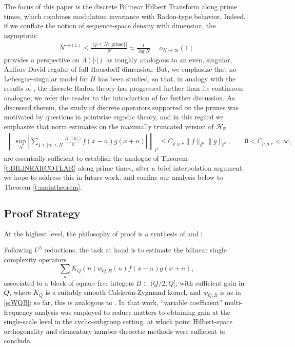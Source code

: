 \documentclass[12pt,leqno]{amsart}
\numberwithin{equation}{section}
\theoremstyle{definition}
\theoremstyle{plain}
\begin{document}
	The focus of this paper is the discrete Bilinear Hilbert Transform along prime times, which combines modulation invariance with Radon-type behavior. Indeed, if we conflate the notion of sequence-space density with dimension, the asymptotic
	\begin{align}
		N^{-o(1)} \leq \frac{|\{p \leq N: \text{ prime}\}|}{N} \approx \frac{1}{\log N} = o_{N\to \infty}(1)
	\end{align}
	provides a perspective on $\Lambda(|\cdot|)$ as roughly analogous to an even, singular, Ahlfors-David regular of full Hausdorff dimension. But, we emphasize that no Lebesgue-singular model for $H$ has been studied, so that, in analogy with the results of \cite{FKMS26}, the discrete Radon theory has progressed further than its continuous analogue; we refer the reader to the introduction of \cite{FKMS26} for further discussion. As discussed therein, the study of discrete operators supported on the primes was motivated by questions in pointwise ergodic theory, and in this regard we emphasize that norm estimates on the maximally truncated version of $\mathcal{H}_{\mathbb{P}}$
	\begin{align}
		\left \| \sup_{N} \left| \sum_{1 \leq |n| \leq N} \frac{\Lambda(|n|)}{n} f(x-n) g(x+n) \right| \right \|_{\ell^r} \leq C_{p,q,r} \|f \|_{\ell^p} \| g \|_{\ell^q}, \qquad 0 < C_{p,q,r} < \infty,
	\end{align}
	are essentially sufficient to establish the analogue of Theorem \ref{t:BILINEARCOTLAR} along prime times, after a brief interpolation argument; we hope to address this in future work, and confine our analysis below to Theorem \ref{t:maintheorem}.
	
	\subsection{Proof Strategy}
	At the highest level, the philosophy of proof is a synthesis of \cite{KMT} and \cite{FKMS26}: 
	
	Following $U^3$ reductions, the task at hand is to estimate the bilinear single complexity operators
	\[
	\sum_n K_{Q}(n)w_{Q,B}(n)f(x-n)g(x+n),
	\] associated to a block of square-free integers $B \subset (Q/2,Q]$, 
	with sufficient gain in $Q$, where $K_Q$ is a suitably smooth Calder\'{o}n-Zygmund kernel, and $w_{Q,B}$ is as in \eqref{e:WQB}; so far, this is analogous to \cite{FKMS26}. In that work, ``variable coefficient'' multi-frequency analysis was employed to reduce matters to obtaining gain at the single-scale level in the cyclic-subgroup setting, at which point Hilbert-space orthogonality and elementary number-theoretic methods were sufficient to conclude.
	
\end{document}
